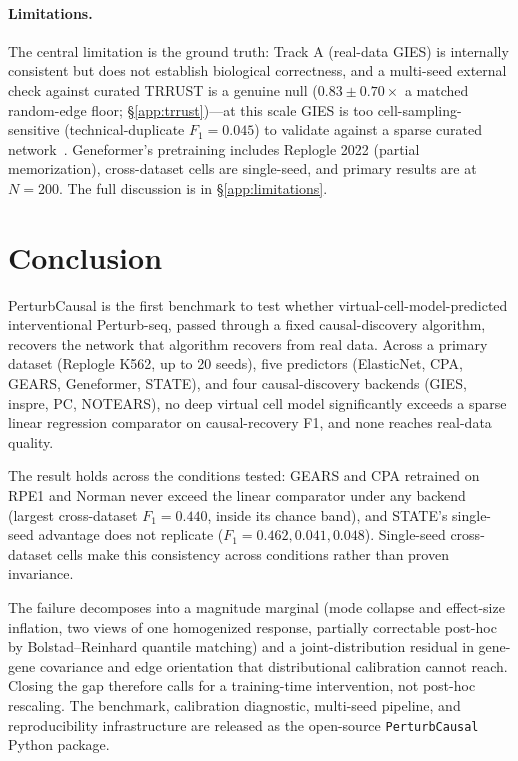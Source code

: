\documentclass{article}
\theoremstyle{plain}
\theoremstyle{definition}
\theoremstyle{remark}
\begin{document}
\paragraph{Limitations.}
\label{sec:limitations}
The central limitation is the ground truth: Track A (real-data GIES) is internally consistent but does not establish biological correctness, and a multi-seed external check against curated TRRUST is a genuine null ($0.83 \pm 0.70\times$ a matched random-edge floor; \S\ref{app:trrust})---at this scale GIES is too cell-sampling-sensitive (technical-duplicate $F_1 = 0.045$) to validate against a sparse curated network~\citep{kernfeld2024fdr}. Geneformer's pretraining includes Replogle 2022 (partial memorization), cross-dataset cells are single-seed, and primary results are at $N=200$. The full discussion is in \S\ref{app:limitations}.

\section{Conclusion}
\label{sec:conclusion}

PerturbCausal is the first benchmark to test whether virtual-cell-model-predicted interventional Perturb-seq, passed through a fixed causal-discovery algorithm, recovers the network that algorithm recovers from real data. Across a primary dataset (Replogle K562, up to 20 seeds), five predictors (ElasticNet, CPA, GEARS, Geneformer, STATE), and four causal-discovery backends (GIES, inspre, PC, NOTEARS), no deep virtual cell model significantly exceeds a sparse linear regression comparator on causal-recovery F1, and none reaches real-data quality.

The result holds across the conditions tested: GEARS and CPA retrained on RPE1 and Norman never exceed the linear comparator under any backend (largest cross-dataset $F_1 = 0.440$, inside its chance band), and STATE's single-seed advantage does not replicate ($F_1 = 0.462, 0.041, 0.048$). Single-seed cross-dataset cells make this consistency across conditions rather than proven invariance.

The failure decomposes into a magnitude marginal (mode collapse and effect-size inflation, two views of one homogenized response, partially correctable post-hoc by Bolstad--Reinhard quantile matching) and a joint-distribution residual in gene-gene covariance and edge orientation that distributional calibration cannot reach. Closing the gap therefore calls for a training-time intervention, not post-hoc rescaling. The benchmark, calibration diagnostic, multi-seed pipeline, and reproducibility infrastructure are released as the open-source \texttt{PerturbCausal} Python package.
\end{document}
